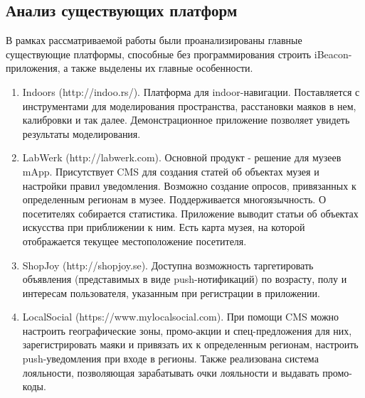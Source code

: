 \subsection{Анализ существующих платформ}

В рамках рассматриваемой работы были проанализированы главные существующие платформы, способные без программирования строить iBeacon-приложения, а также выделены их главные особенности.

\begin{enumerate}
    \item
    Indoors (http://indoo.rs/). Платформа для indoor-навигации. Поставляется с инструментами для моделирования пространства, расстановки маяков в нем, калибровки и так далее. Демонстрационное приложение позволяет увидеть результаты моделирования.
    \item
    LabWerk (http://labwerk.com). Основной продукт - решение для музеев mApp. Присутствует CMS для создания статей об объектах музея и настройки правил уведомления. Возможно создание опросов, привязанных к определенным регионам в музее. Поддерживается многоязычность. О посетителях собирается статистика. Приложение выводит статьи об объектах искусства при приближении к ним. Есть карта музея, на которой отображается текущее местоположение посетителя.
    \item
    ShopJoy (http://shopjoy.se). Доступна возможность таргетировать объявления (представимых в виде push-нотификаций) по возрасту, полу и интересам пользователя, указанным при регистрации в приложении.
    \item
    LocalSocial (https://www.mylocalsocial.com). При помощи CMS можно настроить географические зоны, промо-акции и спец-предложения для них, зарегистрировать маяки и привязать их к определенным регионам, настроить push-уведомления при входе в регионы. Также реализована система лояльности, позволяющая зарабатывать очки лояльности и выдавать промо-коды.
\end{enumerate}